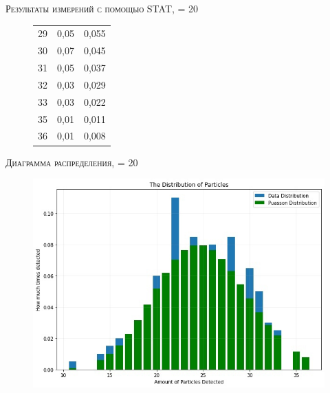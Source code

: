 \documentclass{beamer}%
\begin{document}
\begin{frame}{\textsc{Результаты измерений с помощью STAT}, \tau = 20 }
\begin{figure}[ht]
\begin{minipage}{.5\textwidth}
\begin{table}[t]
\begin{tabular}{|c | c | c |}
                    29  &	0,05    &	0,055 \\
                    30  & 	0,07    &	0,045 \\
                    31  &   0,05    &	0,037 \\
                    32  &   0,03    &	0,029 \\
                    33  &	0,03    &	0,022 \\
                    35  &	0,01    & 	0,011 \\
                    36  &	0,01    &	0,008 \\ [1ex]
                    \hline
                \end{tabular}
            \end{table}
        \end{minipage}
    \end{figure}
\end{frame}

\begin{frame}{\textsc{Диаграмма распределения}, \tau = 20}
    \begin{figure}[ht]
        \includegraphics[width=1.0\linewidth]{images/t_20_dstribution.jpg}
    \end{figure}
\end{frame}
\end{document}
